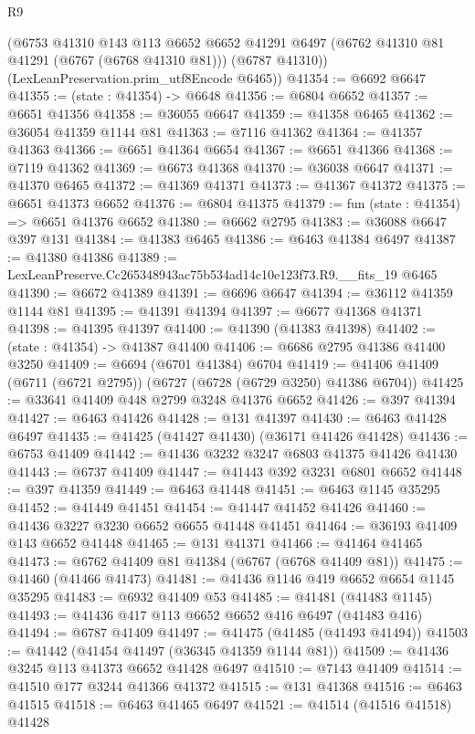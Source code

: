 \begin{lexlean}{R9}
\begin{coremodule}
      (@6753
        @41310
        @143
        @113
        @6652
        @6652
        @41291
        @6497
        (@6762 @41310 @81 @41291 (@6767 (@6768 @41310 @81)))
        (@6787 @41310))
      (LexLeanPreservation.prim_utf8Encode @6465))
@41354 := @6692 @6647
@41355 := (state : @41354) -> @6648
@41356 := @6804 @6652
@41357 := @6651 @41356
@41358 := @36055 @6647
@41359 := @41358 @6465
@41362 := @36054 @41359 @1144 @81
@41363 := @7116 @41362
@41364 := @41357 @41363
@41366 := @6651 @41364 @6654
@41367 := @6651 @41366
@41368 := @7119 @41362
@41369 := @6673 @41368
@41370 := @36038 @6647
@41371 := @41370 @6465
@41372 := @41369 @41371
@41373 := @41367 @41372
@41375 := @6651 @41373 @6652
@41376 := @6804 @41375
@41379 := fun (state : @41354) => @6651 @41376 @6652
@41380 := @6662 @2795
@41383 := @36088 @6647 @397 @131
@41384 := @41383 @6465
@41386 := @6463 @41384 @6497
@41387 := @41380 @41386
@41389 := LexLeanPreserve.Cc265348943ac75b534ad14c10e123f73.R9.__fits_19 @6465
@41390 := @6672 @41389
@41391 := @6696 @6647
@41394 := @36112 @41359 @1144 @81
@41395 := @41391 @41394
@41397 := @6677 @41368 @41371
@41398 := @41395 @41397
@41400 := @41390 (@41383 @41398)
@41402 := (state : @41354) -> @41387 @41400
@41406 := @6686 @2795 @41386 @41400 @3250
@41409 := @6694 (@6701 @41384) @6704
@41419 := @41406 @41409 (@6711 (@6721 @2795)) (@6727 (@6728 (@6729 @3250) @41386 @6704))
@41425 := @33641 @41409 @448 @2799 @3248 @41376 @6652
@41426 := @397 @41394
@41427 := @6463 @41426
@41428 := @131 @41397
@41430 := @6463 @41428 @6497
@41435 := @41425 (@41427 @41430) (@36171 @41426 @41428)
@41436 := @6753 @41409
@41442 := @41436 @3232 @3247 @6803 @41375 @41426 @41430
@41443 := @6737 @41409
@41447 := @41443 @392 @3231 @6801 @6652
@41448 := @397 @41359
@41449 := @6463 @41448
@41451 := @6463 @1145 @35295
@41452 := @41449 @41451
@41454 := @41447 @41452 @41426
@41460 := @41436 @3227 @3230 @6652 @6655 @41448 @41451
@41464 := @36193 @41409 @143 @6652 @41448
@41465 := @131 @41371
@41466 := @41464 @41465
@41473 := @6762 @41409 @81 @41384 (@6767 (@6768 @41409 @81))
@41475 := @41460 (@41466 @41473)
@41481 := @41436 @1146 @419 @6652 @6654 @1145 @35295
@41483 := @6932 @41409 @53
@41485 := @41481 (@41483 @1145)
@41493 := @41436 @417 @113 @6652 @6652 @416 @6497 (@41483 @416)
@41494 := @6787 @41409
@41497 := @41475 (@41485 (@41493 @41494))
@41503 := @41442 (@41454 @41497 (@36345 @41359 @1144 @81))
@41509 := @41436 @3245 @113 @41373 @6652 @41428 @6497
@41510 := @7143 @41409
@41514 := @41510 @177 @3244 @41366 @41372
@41515 := @131 @41368
@41516 := @6463 @41515
@41518 := @6463 @41465 @6497
@41521 := @41514 (@41516 @41518) @41428

\end{coremodule}
\end{lexlean}
